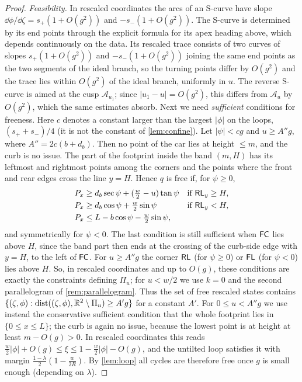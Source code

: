 \begin{proof}
\emph{Feasibility.}
In rescaled coordinates the arcs of an S-curve have slope $\dd\phi/\dd\zeta=s_+(1+O(g^2))$ and $-s_-(1+O(g^2))$.
The S-curve is determined by its end points through the explicit formula for its apex heading above, which depends continuously on the data. Its rescaled trace consists of two curves of slopes $s_+(1+O(g^2))$ and $-s_-(1+O(g^2))$ joining the same end points as the two segments of the ideal branch, so the turning points differ by $O(g^2)$ and the trace lies within $O(g^2)$ of the ideal branch, uniformly in $u$. The reverse S-curve is aimed at the cusp $\mathcal A_{u_1}$; since $|u_1-u|=O(g^2)$, this differs from $\mathcal A_u$ by $O(g^2)$, which the same estimates absorb.
Next we need \emph{sufficient} conditions for freeness.
Here $c$ denotes a constant larger than the largest $|\phi|$ on the loops, $(s_++s_-)/4$ (it is not the constant of \cref{lem:confine}).
Let $|\psi|<cg$ and $u\ge A''g$, where $A''=2c(b+d_b)$.
Then no point of the car lies at height $\le m$, and the curb is no issue.
The part of the footprint inside the band $(m,H)$ has its leftmost and rightmost points among the corners and the points where the front and rear edges cross the line $y=H$.
Hence $q$ is free if, for $\psi\ge0$,
\begin{align*}
  P_x&\ge d_b\sec\psi+(\tfrac w2-u)\tan\psi &&\text{if }\mathsf{RL}_y\ge H,\\
  P_x&\ge d_b\cos\psi+\tfrac w2\sin\psi &&\text{if }\mathsf{RL}_y<H,\\
  P_x&\le L-b\cos\psi-\tfrac w2\sin\psi ,
\end{align*}
and symmetrically for $\psi<0$.
The last condition is still sufficient when $\mathsf{FC}$ lies above $H$, since the band part then ends at the crossing of the curb-side edge with $y=H$, to the left of $\mathsf{FC}$.
For $u\ge A''g$ the corner $\mathsf{RL}$ (for $\psi\ge0$) or $\mathsf{FL}$ (for $\psi<0$) lies above $H$.
So, in rescaled coordinates and up to $O(g)$, these conditions are exactly the constraints defining $\Pi_u$; for $u<w/2$ we use $k=0$ and the second parallelogram of \cref{rem:parallelogram}.
Thus the set of free rescaled states contains $\{(\zeta,\phi):\mathrm{dist}((\zeta,\phi),\mathbb{R}^2\setminus\Pi_u)\ge A'g\}$ for a constant $A'$.
For $0\le u<A''g$ we use instead the conservative sufficient condition that the whole footprint lies in $\{0\le x\le L\}$; the curb is again no issue, because the lowest point is at height at least $m-O(g)>0$.
In rescaled coordinates this reads $\tfrac w2|\phi|+O(g)\le\xi\le1-\tfrac w2|\phi|-O(g)$, and the untilted loop satisfies it with margin $\frac{1-\lambda}2(1-\frac w{2R})$.
By \cref{lem:loop} all cycles are therefore free once $g$ is small enough (depending on $\lambda$).


\end{proof}
